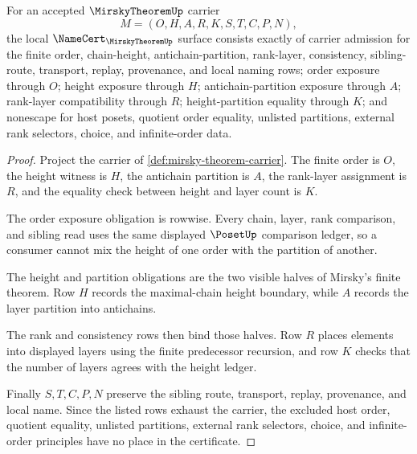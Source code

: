\begin{theorem}
\label{thm:mirsky-theorem-namecert-obligations}
For an accepted $\MirskyTheoremUp$ carrier
$$
M=(O,H,A,R,K,S,T,C,P,N),
$$
the local $\NameCert_{\MirskyTheoremUp}$ surface consists exactly of carrier admission for the finite order, chain-height, antichain-partition, rank-layer, consistency, sibling-route, transport, replay, provenance, and local naming rows; order exposure through $O$; height exposure through $H$; antichain-partition exposure through $A$; rank-layer compatibility through $R$; height-partition equality through $K$; and nonescape for host posets, quotient order equality, unlisted partitions, external rank selectors, choice, and infinite-order data.
\end{theorem}
\begin{proof}
Project the carrier of \autoref{def:mirsky-theorem-carrier}. The finite order is $O$, the height witness is $H$, the antichain partition is $A$, the rank-layer assignment is $R$, and the equality check between height and layer count is $K$.

The order exposure obligation is rowwise. Every chain, layer, rank comparison, and sibling read uses the same displayed $\PosetUp$ comparison ledger, so a consumer cannot mix the height of one order with the partition of another.

The height and partition obligations are the two visible halves of Mirsky's finite theorem. Row $H$ records the maximal-chain height boundary, while $A$ records the layer partition into antichains.

The rank and consistency rows then bind those halves. Row $R$ places elements into displayed layers using the finite predecessor recursion, and row $K$ checks that the number of layers agrees with the height ledger.

Finally $S,T,C,P,N$ preserve the sibling route, transport, replay, provenance, and local name. Since the listed rows exhaust the carrier, the excluded host order, quotient equality, unlisted partitions, external rank selectors, choice, and infinite-order principles have no place in the certificate.
\end{proof}

